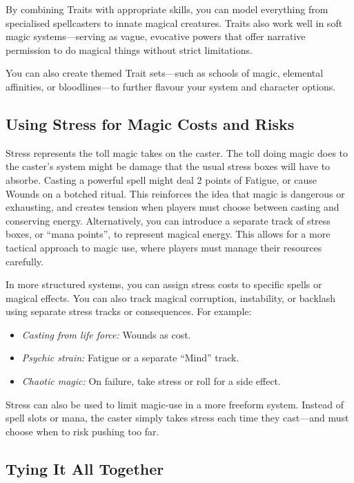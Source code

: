 By combining Traits with appropriate skills, you can model everything from specialised spellcasters to innate magical creatures. Traits also work well in soft magic systems—serving as vague, evocative powers that offer narrative permission to do magical things without strict limitations.

You can also create themed Trait sets—such as schools of magic, elemental affinities, or bloodlines—to further flavour your system and character options.

\subsection*{Using Stress for Magic Costs and Risks}

Stress represents the toll magic takes on the caster. The toll doing magic does to the caster's system might be damage that the usual stress boxes will have to absorbe. Casting a powerful spell might deal 2 points of Fatigue, or cause Wounds on a botched ritual. This reinforces the idea that magic is dangerous or exhausting, and creates tension when players must choose between casting and conserving energy. Alternatively, you can introduce a separate track of stress boxes, or ``mana points'', to represent magical energy. This allows for a more tactical approach to magic use, where players must manage their resources carefully.

In more structured systems, you can assign stress costs to specific spells or magical effects. You can also track magical corruption, instability, or backlash using separate stress tracks or consequences. For example:
\begin{itemize}
    \item \textit{Casting from life force:} Wounds as cost.
    \item \textit{Psychic strain:} Fatigue or a separate “Mind” track.
    \item \textit{Chaotic magic:} On failure, take stress or roll for a side effect.
\end{itemize}

Stress can also be used to limit magic-use in a more freeform system. Instead of spell slots or mana, the caster simply takes stress each time they cast—and must choose when to risk pushing too far.

\subsection*{Tying It All Together}

